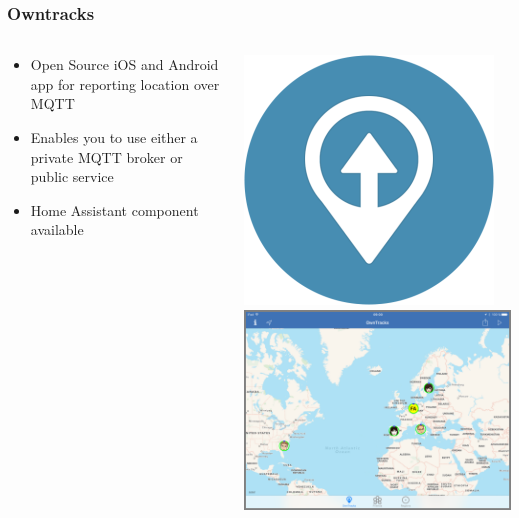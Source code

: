 \documentclass[aspectratio=169,11pt,hyperref={colorlinks=true}]{beamer}
\begin{document}
\begin{frame}
    \frametitle{Owntracks}
    \begin{columns}[T]
        \begin{column}{.48\textwidth}
            \begin{minipage}[c][.75\textheight][c]{\linewidth}
            \begin{itemize}
                \item Open Source iOS and Android app for reporting location over MQTT
                \item Enables you to use either a private MQTT broker or public service
                \item Home Assistant component available
            \end{itemize}
        \end{minipage}
        \end{column}
        \begin{column}{.48\textwidth}
            \centering
            \begin{centering}
                \includegraphics[height=.35\textheight]{logo-small.png}\\
                \vspace{5mm}
                \includegraphics[width=.8\textwidth]{ipad-public-map.png}
            \end{centering}
        \end{column}
    \end{columns}
\end{frame}
\end{document}
